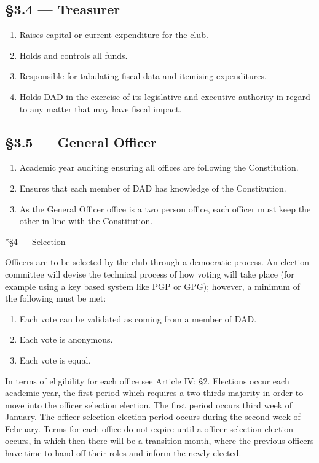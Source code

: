 \documentclass[11pt]{report}
\makeatletter
\renewcommand{\section}{\@startsection{subsection}{2}{0mm}{-\baselineskip}{0.5\baselineskip}{\normalfont\large\bf}}
\makeatother
\begin{document}
	\subsection*{\S3.4 --- Treasurer}
	\begin{enumerate}
		\item Raises capital or current expenditure for the club.
		\item Holds and controls all funds.
		\item Responsible for tabulating fiscal data and itemising expenditures.
		\item Holds DAD in the exercise of its legislative and executive authority in regard to any matter that may have fiscal impact.
	\end{enumerate}
	\subsection*{\S3.5 --- General Officer}
	\begin{enumerate}
		\item Academic year auditing ensuring all offices are following the Constitution.
		\item Ensures that each member of DAD has knowledge of the Constitution.
		\item As the General Officer office is a two person office, each officer must keep the other in line with the Constitution.
	\end{enumerate}
	\section*{\S4 --- Selection}
	
	Officers are to be selected by the club through a democratic process. An election committee will devise the technical process of how voting will take place (for example using a key based system like PGP or GPG); however, a minimum of the following must be met:
	
	\begin{enumerate}
		\item Each vote can be validated as coming from a member of DAD.
		\item Each vote is anonymous.
		\item Each vote is equal.
	\end{enumerate}
	
	In terms of eligibility for each office see Article IV: \S2. Elections occur each academic year, the first period which requires a two-thirds majority in order to move into the officer selection election. The first period occurs third week of January. The officer selection election period occurs during the second week of February. Terms for each office do not expire until a officer selection election occurs, in which then there will be a transition month, where the previous officers have time to hand off their roles and inform the newly elected.
\end{document}
